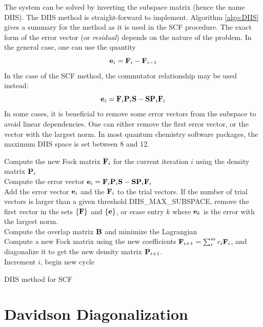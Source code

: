 \noindent The system can be solved by inverting the subspace matrix (hence the name DIIS). 
The DIIS method is straight-forward to implement. Algorithm \ref{algo:DIIS} gives a summary for the method as it is used in the SCF procedure. 
The exact form of the error vector (or \emph{residual}) depends on the nature of the problem. In the general case, one can use the quantity
\begin{equation}
\mathbf{e}_i = \mathbf{F}_i - \mathbf{F}_{i-1}
\end{equation}
\noindent In the case of the SCF method, the commutator relationship may be used instead:
\begin{equation}
\mathbf{e}_i = \mathbf{F}_i \mathbf{P}_i \mathbf{S} - \mathbf{S} \mathbf{P}_i \mathbf{F}_i 
\end{equation}
In some cases, it is beneficial to remove some error vectors from the subspace to avoid linear dependencies. One can either remove the first error vector, or the vector with the largest norm. In most quantum chemistry software packages, the maximum DIIS space is set between 8 and 12. 

\begin{algorithm}
Compute the new Fock matrix $\mathbf{F}_i$ for the current iteration $i$ using the density matrix $\mathbf{P}_i$
\\
Compute the error vector $\mathbf{e}_i = \mathbf{F}_i \mathbf{P}_i \mathbf{S} - \mathbf{S} \mathbf{P}_i \mathbf{F}_i$
\\
Add the error vector $\mathbf{e}_i$ and the $\mathbf{F}_i$ to the trial vectors. If the number of trial vectors is larger than a given threshold \textrm{DIIS\_MAX\_SUBSPACE}, remove  the first vector in the sets $\{\mathbf{F}\}$ and $\{\mathbf{e}\}$, or erase entry $k$ where $\mathbf{e}_k$ is the error with the largest norm.
\\
Compute the overlap matrix $\mathbf{B}$ and minimize the Lagrangian
\\
Compute a new Fock matrix using the new coefficients $\mathbf{F}_{i+1} = \sum_i^m c_i \mathbf{F}_i$, and diagonalize it to get the new density matrix $\mathbf{P}_{i+1}$. 
\\
Increment $i$, begin new cycle
\caption{DIIS method for SCF}
\label{algo:DIIS}
\end{algorithm} 

\section{Davidson Diagonalization \label{sec:DAV}}

